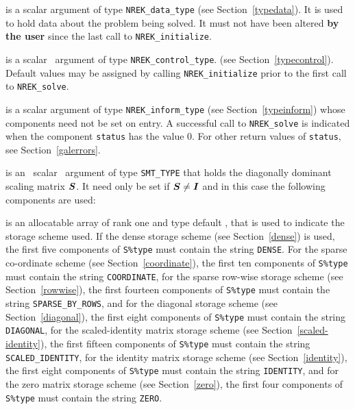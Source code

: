 \documentclass{galahad}
\newcommand{\packagename}{NREK}
\begin{document}
\begin{description}
 is a scalar \intentinout argument of type
{\tt \packagename\_data\_type}
(see Section~\ref{typedata}). It is used to hold data about the problem being
solved. It must not have been altered {\bf by the user} since the last call to
{\tt \packagename\_initialize}.

 is a scalar \intentin\ argument of type
{\tt \packagename\_control\_type}.
(see Section~\ref{typecontrol}).
Default values may be assigned by calling {\tt \packagename\_initialize}
prior to the first call to {\tt \packagename\_solve}.

 is a scalar \intentinout argument of type
{\tt \packagename\_inform\_type}
(see Section~\ref{typeinform})
whose components need not be set on entry.
A successful call to
{\tt \packagename\_solve}
is indicated when the  component {\tt status} has the value 0.
For other return values of {\tt status}, see Section~\ref{galerrors}.

 is an \optional\ scalar \intentin\ argument of type {\tt SMT\_TYPE}
that holds the diagonally dominant scaling matrix ${\bm{S}}$. It need only be set
if ${\bm{S}} \neq {\bm{I}}$ and in this case the following components are used:

\begin{description}

 is an allocatable array of rank one and type default
\character, that
is used to indicate the storage scheme used. If the dense storage scheme
(see Section~\ref{dense}) is used,
the first five components of {\tt S\%type} must contain the
string {\tt DENSE}.
For the sparse co-ordinate scheme (see Section~\ref{coordinate}),
the first ten components of {\tt S\%type} must contain the
string {\tt COORDINATE},
for the sparse row-wise storage scheme (see Section~\ref{rowwise}),
the first fourteen components of {\tt S\%type} must contain the
string {\tt SPARSE\_BY\_ROWS},
and for the diagonal storage scheme (see Section~\ref{diagonal}),
the first eight components of {\tt S\%type} must contain the
string {\tt DIAGONAL},
for the scaled-identity matrix storage scheme
(see Section~\ref{scaled-identity}),
the first fifteen components of {\tt S\%type} must contain the
string {\tt SCALED\_IDENTITY},
for the identity matrix storage scheme
(see Section~\ref{identity}),
the first eight components of {\tt S\%type} must contain the
string {\tt IDENTITY}, and
for the zero matrix storage scheme
(see Section~\ref{zero}),
the first four components of {\tt S\%type} must contain the
string {\tt ZERO}.


\end{description}
\end{description}
\end{document}
